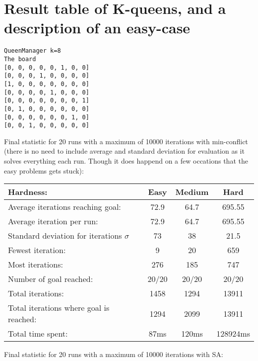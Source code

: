 \documentclass[12pt, a4paper]{article}
\begin{document}
\section{Result table of K-queens, and a description of an easy-case}
\begin{verbatim}
QueenManager k=8
The board 
[0, 0, 0, 0, 0, 1, 0, 0]
[0, 0, 0, 1, 0, 0, 0, 0]
[1, 0, 0, 0, 0, 0, 0, 0]
[0, 0, 0, 0, 1, 0, 0, 0]
[0, 0, 0, 0, 0, 0, 0, 1]
[0, 1, 0, 0, 0, 0, 0, 0]
[0, 0, 0, 0, 0, 0, 1, 0]
[0, 0, 1, 0, 0, 0, 0, 0]

\end{verbatim}
\noindent
Final statistic for 20 runs with a maximum of 10000 iterations with min-conflict (there is no need to include average and standard deviation for evaluation as it solves everything each run. Though it does happend on a few occations that the easy problems gets stuck):\\
\begin{center}
  \begin{tabular}{| l | c c c|}
    \hline
    Hardness: &\textbf{Easy} & \textbf{Medium} & \textbf{Hard} \\ \hline
    Average iterations reaching goal: & 72.9& 64.7 & 695.55\\
    Average iteration per run:  & 72.9 & 64.7 & 695.55\\
    Standard deviation for iterations $\sigma$ & 73 & 38 & 21.5\\
    Fewest iteration: & 9 & 20& 659\\ 
    Most iterations: & 276 & 185& 747\\ 
    Number of goal reached: & 20/20 & 20/20 & 20/20\\
    Total iterations: & 1458 & 1294& 13911\\
    Total iterations where goal is reached: & 1294 & 2099& 13911\\
    Total time spent: & 87ms & 120ms & 128924ms\\
    \hline
  \end{tabular}
\end{center}
\noindent
Final statistic for 20 runs with a maximum of 10000 iterations with SA:\\
\end{document}
